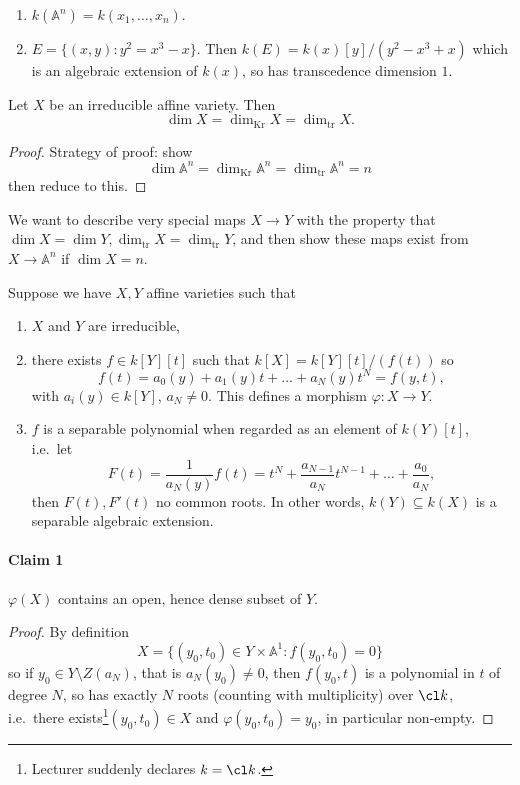 \documentclass[a4paper]{article}
\renewcommand{\A}{\mathbb{A}}
\begin{document}
\begin{eg}\leavevmode
  \begin{enumerate}
  \item \(k(\A^n) = k(x_1, \dots, x_n)\).
  \item \(E = \{(x, y): y^2 = x^3 - x\}\). Then \(k(E) = k(x)[y]/(y^2 - x^3 + x)\) which is an algebraic extension of \(k(x)\), so has transcedence dimension \(1\).
  \end{enumerate}
\end{eg}

\begin{theorem}
  Let \(X\) be an irreducible affine variety. Then
  \[
    \dim X = \dim_{\text{Kr}} X = \dim_{\text{tr}} X.
  \]
\end{theorem}

\begin{proof}
  Strategy of proof: show
  \[
    \dim \A^n = \dim_{\text{Kr}} \A^n = \dim_{\text{tr}} \A^n = n
  \]
  then reduce to this.
\end{proof}

We want to describe very special maps \(X \to Y\) with the property that \(\dim X = \dim Y, \dim_{\text{tr}} X = \dim_{\text{tr}} Y\), and then show these maps exist from \(X \to \A^n\) if \(\dim X = n\).

Suppose we have \(X, Y\) affine varieties such that
\begin{enumerate}
\item \(X\) and \(Y\) are irreducible,
\item there exists \(f \in k[Y][t]\) such that \(k[X] = k[Y][t]/(f(t))\) so
  \[
    f(t) = a_0(y) + a_1(y)t + \dots + a_N(y)t^N = f(y, t),
  \]
  with \(a_i(y) \in k[Y]\), \(a_N \neq 0\). This defines a morphism \(\varphi: X \to Y\).
\item \(f\) is a separable polynomial when regarded as an element of \(k(Y)[t]\), i.e.\ let
\[
  F(t) = \frac{1}{a_N(y)} f(t) = t^N + \frac{a_{N - 1}}{a_N} t^{N - 1} + \dots + \frac{a_0}{a_N},
\]
then \(F(t), F'(t)\) no common roots. In other words, \(k(Y) \subseteq k(X)\) is a separable algebraic extension.
\end{enumerate}

\paragraph{Claim 1}

\(\varphi(X)\) contains an open, hence dense subset of \(Y\).

\begin{proof}
  By definition
  \[
    X = \{(y_0, t_0) \in Y \times \A^1: f(y_0, t_0) = 0\}
  \]
  so if \(y_0 \in Y \setminus Z(a_N)\), that is \(a_N(y_0) \neq 0\), then \(f(y_0, t)\) is a polynomial in \(t\) of degree \(N\), so has exactly \(N\) roots (counting with multiplicity) over \(\cl k\), i.e.\ there exists\footnote{Lecturer suddenly declares \(k = \cl k\).}\((y_0, t_0) \in X\) and \(\varphi(y_0, t_0) = y_0\), in particular non-empty.
\end{proof}
\end{document}
